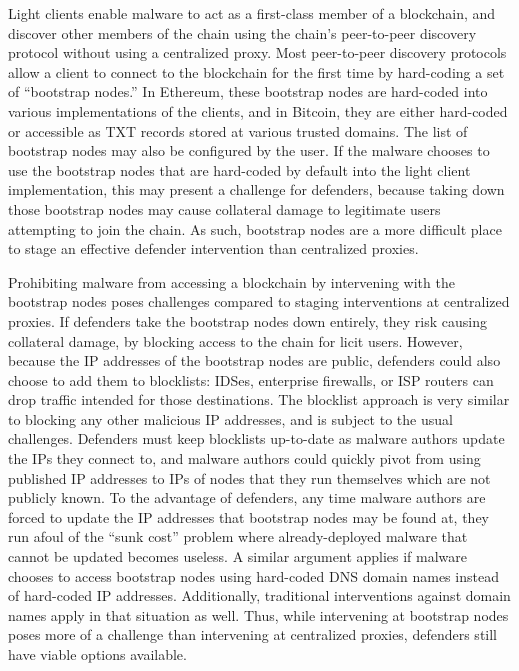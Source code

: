 Light clients enable malware to act as a first-class member 
of a blockchain, and discover other members of the chain 
using the chain's peer-to-peer discovery protocol without 
using a centralized proxy. Most peer-to-peer discovery 
protocols allow a client to connect to the blockchain for the 
first time by hard-coding a set of ``bootstrap nodes.'' In 
Ethereum, these bootstrap nodes are hard-coded into various 
implementations of the clients, and in Bitcoin, they are 
either hard-coded or accessible as TXT records stored at 
various trusted domains. The list of bootstrap nodes may also 
be configured by the user. If the 
malware chooses to use the bootstrap nodes that are 
hard-coded by default into the light client implementation, 
this may present a challenge for defenders, because taking 
down those bootstrap nodes may cause collateral damage to 
legitimate users attempting to join the chain. As such, 
bootstrap nodes are a more difficult place to stage an 
effective defender intervention than centralized proxies. 

Prohibiting malware from accessing a blockchain by intervening with the 
bootstrap nodes poses challenges compared to staging interventions at 
centralized proxies. If 
defenders take the bootstrap nodes down entirely, they risk causing 
collateral damage, by blocking 
access to the chain for licit users. However, because the IP addresses of 
the bootstrap nodes are 
public, defenders could also choose to add them to blocklists: IDSes, 
enterprise firewalls, or ISP 
routers can drop traffic intended for those destinations. The blocklist 
approach is very similar to 
blocking any other malicious IP addresses, and is subject to the usual 
challenges. Defenders must 
keep blocklists up-to-date as malware authors update the IPs they connect to, 
and malware authors 
could quickly pivot from using published IP addresses to IPs of nodes that they 
run 
themselves which are not publicly known. To the advantage of defenders, 
any time malware authors 
are forced to update the IP addresses that bootstrap nodes may be found at, 
they run 
afoul of the ``sunk cost'' problem where already-deployed malware that cannot 
be updated becomes 
useless. A similar argument applies if malware chooses to access bootstrap 
nodes using hard-coded 
DNS domain names instead of hard-coded IP addresses. Additionally, 
traditional interventions 
against domain names apply in that situation as well. Thus, while 
intervening at bootstrap nodes 
poses more of a challenge than intervening at centralized proxies, defenders 
still have viable 
options available.

